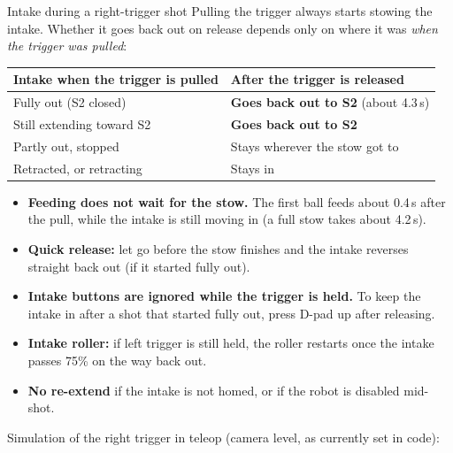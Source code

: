 \documentclass[11pt]{article}
\begin{document}
\medskip
\begin{drivenote}{Intake during a right-trigger shot}
Pulling the trigger always starts stowing the intake. Whether it goes back out on release depends
only on where it was \emph{when the trigger was pulled}:

\smallskip
\begin{tabularx}{\linewidth}{>{\raggedright\arraybackslash}p{5.2cm} L}
\toprule
\textbf{Intake when the trigger is pulled} & \textbf{After the trigger is released} \\
\midrule
Fully out (S2 closed)            & \textbf{Goes back out to S2} (about 4.3\,s) \\
Still extending toward S2        & \textbf{Goes back out to S2} \\
Partly out, stopped              & Stays wherever the stow got to \\
Retracted, or retracting         & Stays in \\
\bottomrule
\end{tabularx}

\smallskip
\begin{itemize}[leftmargin=*]
  \item \textbf{Feeding does not wait for the stow.} The first ball feeds about 0.4\,s after the
    pull, while the intake is still moving in (a full stow takes about 4.2\,s).
  \item \textbf{Quick release:} let go before the stow finishes and the intake reverses straight
    back out (if it started fully out).
  \item \textbf{Intake buttons are ignored while the trigger is held.} To keep the intake in after
    a shot that started fully out, press D-pad up after releasing.
  \item \textbf{Intake roller:} if left trigger is still held, the roller restarts once the intake
    passes 75\% on the way back out.
  \item \textbf{No re-extend} if the intake is not homed, or if the robot is disabled mid-shot.
\end{itemize}
\end{drivenote}

\medskip
Simulation of the right trigger in teleop (camera level, as currently set in code):
\end{document}
